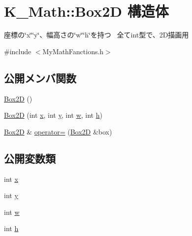 \hypertarget{struct_k___math_1_1_box2_d}{}\section{K\+\_\+\+Math\+:\+:Box2D 構造体}
\label{struct_k___math_1_1_box2_d}


座標の\char`\"{}x\char`\"{}\char`\"{}y\char`\"{}、幅高さの\char`\"{}w\char`\"{}\char`\"{}h\char`\"{}を持つ~\newline
全てint型で、2\+D描画用  




{\ttfamily \#include $<$My\+Math\+Fanctions.\+h$>$}

\subsection*{公開メンバ関数}
\begin{DoxyCompactItemize}
\item 
\mbox{\hyperlink{struct_k___math_1_1_box2_d_a358b6caf8258401115b46e6e6b1352f4}{Box2D}} ()
\item 
\mbox{\hyperlink{struct_k___math_1_1_box2_d_ad83faeb716bef219c197b8ae6cd8cb57}{Box2D}} (int \mbox{\hyperlink{struct_k___math_1_1_box2_d_a6538275d6c5461d3b9f3855995fb9959}{x}}, int \mbox{\hyperlink{struct_k___math_1_1_box2_d_af410df89cae1158f086bc1da564341c3}{y}}, int \mbox{\hyperlink{struct_k___math_1_1_box2_d_a487b65240733f294df1fd47565b97bbe}{w}}, int \mbox{\hyperlink{struct_k___math_1_1_box2_d_aa2748256cc120ac6f245bcee1923beaa}{h}})
\item 
\mbox{\hyperlink{struct_k___math_1_1_box2_d}{Box2D}} \& \mbox{\hyperlink{struct_k___math_1_1_box2_d_a69ed48590dac9fd0d1ea1b36ccc3186b}{operator=}} (\mbox{\hyperlink{struct_k___math_1_1_box2_d}{Box2D}} \&box)
\end{DoxyCompactItemize}
\subsection*{公開変数類}
\begin{DoxyCompactItemize}
\item 
int \mbox{\hyperlink{struct_k___math_1_1_box2_d_a6538275d6c5461d3b9f3855995fb9959}{x}}
\item 
int \mbox{\hyperlink{struct_k___math_1_1_box2_d_af410df89cae1158f086bc1da564341c3}{y}}
\item 
int \mbox{\hyperlink{struct_k___math_1_1_box2_d_a487b65240733f294df1fd47565b97bbe}{w}}
\item 
int \mbox{\hyperlink{struct_k___math_1_1_box2_d_aa2748256cc120ac6f245bcee1923beaa}{h}}
\end{DoxyCompactItemize}



